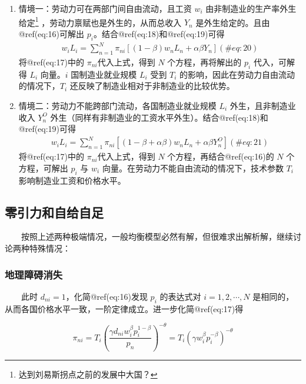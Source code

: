 \documentclass[]{tufte-handout}
\begin{document}
\begin{enumerate}
\def\labelenumi{\arabic{enumi}.}
\item
  情境一：劳动力可在两部门间自由流动，且工资 \(w_i\)
  由非制造业的生产率外生给定\footnote{达到刘易斯拐点之前的发展中大国？}
  ，劳动力禀赋也是外生的，从而总收入 \(Y_n\)
  是外生给定的。且由@ref(eq:16)可解出
  \(p_i\)。结合@ref(eq:18)和@ref(eq:19)可得 \begin{align}
  w_{i} L_{i}=\sum_{n=1}^{N} \pi_{n i}\left[(1-\beta) w_{n} L_{n}+\alpha \beta Y_{n}\right] (\#eq:20)
  \end{align} 将@ref(eq:17)中的 \(\pi_{ni}\)代入上式，得到 \(N\)
  个方程，再将解出的 \(p_i\) 代入，可解得 \(L_{i}\) 向量。\(i\)
  国制造业就业规模 \(L_{i}\) 受到 \(T_i\)
  的影响，因此在劳动力自由流动的情况下，\(T_i\)
  还反映了制造业相对于非制造业的比较优势。
\item
  情境二：劳动力不能跨部门流动，各国制造业就业规模 \(L_{i}\)
  外生，且非制造业收入 \(Y_n^O\)
  外生（同样有非制造业的工资水平外生）。结合@ref(eq:18)和@ref(eq:19)可得
  \begin{align}
  w_{i} L_{i}=\sum_{n=1}^{N} \pi_{n i}\left[(1-\beta+\alpha \beta) w_{n} L_{n}+\alpha \beta Y_{n}^{O}\right] (\#eq:21)
  \end{align} 将@ref(eq:17)中的 \(\pi_{ni}\)代入上式，得到 \(N\)
  个方程，再结合@ref(eq:16)的 \(N\) 个方程，可解出 \(p_i\) 与 \(w_{i}\)
  向量。在劳动力不能自由流动的情况下，技术参数 \(T_i\)
  影响制造业工资和价格水平。
\end{enumerate}

\hypertarget{ux96f6ux5f15ux529bux548cux81eaux7ed9ux81eaux8db3}{%
\subsection{零引力和自给自足}\label{ux96f6ux5f15ux529bux548cux81eaux7ed9ux81eaux8db3}}

　　按照上述两种极端情况，一般均衡模型必然有解，但很难求出解析解，继续讨论两种特殊情况：

\hypertarget{ux5730ux7406ux969cux788dux6d88ux5931}{%
\subsubsection{地理障碍消失}\label{ux5730ux7406ux969cux788dux6d88ux5931}}

　　此时 \(d_{ni}=1\)，化简@ref(eq:16)发现 \(p_i\) 的表达式对
\(i=1,2,\cdots,N\)
是相同的，从而各国价格水平一致，一阶定律成立。进一步化简@ref(eq:17)得

\[\pi_{n i}=T_{i}\left(\frac{\gamma d_{n i} w_{i}^{\beta} p_{i}^{1-\beta}}{p_{n}}\right)^{-\theta}=T_{i}\left(\gamma w_{i}^{\beta} p_{i}^{-\beta}\right)^{-\theta}\]
\end{document}
